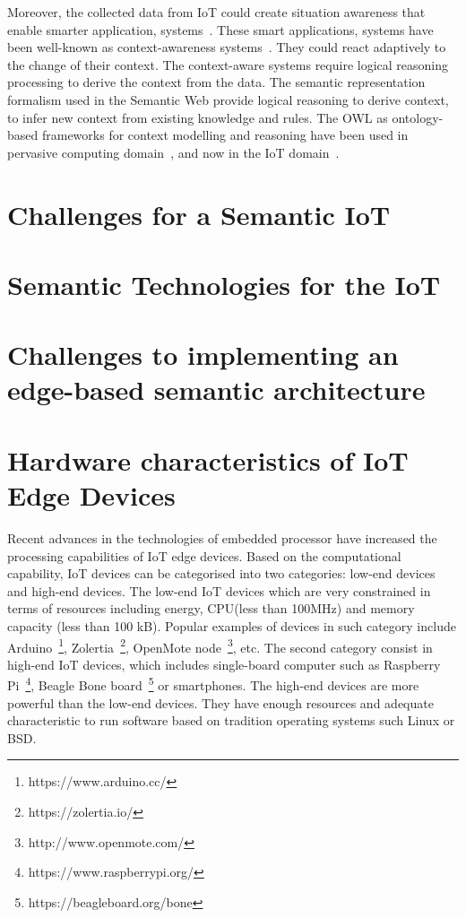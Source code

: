Moreover, the collected data from IoT could create situation awareness that enable smarter application, systems~\citep{Barnaghi:2012}.
These smart applications, systems have been well-known as context-awareness systems~\citep{Baldauf:2007}.
They could react adaptively to the change of their context. 
The context-aware systems require logical reasoning processing to derive the context from the data.
The semantic representation formalism used in the Semantic Web provide logical reasoning to derive context, to infer new context from existing knowledge and rules.
The OWL as ontology-based frameworks for context modelling and reasoning have been used in pervasive computing domain~\citep{Mikko:2009,Bettini:2010}, and now in the IoT domain~\citep{Perera:2014}.


\section{Challenges for a Semantic IoT}

\section{Semantic Technologies for the IoT}

\section{Challenges to implementing an edge-based semantic architecture}


\section{Hardware characteristics of IoT Edge Devices}

Recent advances in the technologies of embedded processor have increased the processing capabilities of IoT edge devices.
Based on the computational capability, IoT devices can be categorised into two categories: low-end devices and high-end devices.
The low-end IoT devices which are very constrained in terms of resources including energy, CPU(less than 100MHz) and memory capacity (less than 100 kB).
Popular examples of devices in such category include 
Arduino~\footnote{https://www.arduino.cc/}, 
Zolertia~\footnote{https://zolertia.io/}, 
OpenMote node~\footnote{http://www.openmote.com/}, etc.
The second category consist in high-end IoT devices, which includes single-board computer such as Raspberry Pi~\footnote{https://www.raspberrypi.org/}, 
Beagle Bone board~\footnote{https://beagleboard.org/bone} or 
smartphones.
The high-end devices are more powerful than the low-end devices.
They have enough resources and adequate characteristic to run software based on tradition operating systems such Linux or BSD. 

